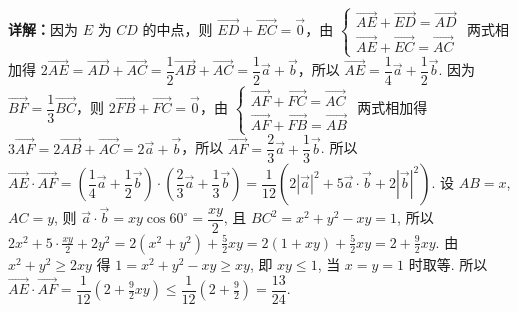 \begin{question}[points=5]
\begin{solution}
\textbf{详解：}因为 $E$ 为 $CD$ 的中点，则 $\overrightarrow{ED} + \overrightarrow{EC} = \vec{0}$，由 $\begin{cases} \overrightarrow{AE} + \overrightarrow{ED} = \overrightarrow{AD} \\ \overrightarrow{AE} + \overrightarrow{EC} = \overrightarrow{AC} \end{cases}$ 两式相加得 $2\overrightarrow{AE} = \overrightarrow{AD} + \overrightarrow{AC} = \dfrac{1}{2}\overrightarrow{AB} + \overrightarrow{AC} = \dfrac{1}{2}\vec{a} + \vec{b}$，所以 $\overrightarrow{AE} = \dfrac{1}{4}\vec{a} + \dfrac{1}{2}\vec{b}$. 因为 $\overrightarrow{BF} = \dfrac{1}{3}\overrightarrow{BC}$，则 $2\overrightarrow{FB} + \overrightarrow{FC} = \vec{0}$，由 $\begin{cases} \overrightarrow{AF} + \overrightarrow{FC} = \overrightarrow{AC} \\ \overrightarrow{AF} + \overrightarrow{FB} = \overrightarrow{AB} \end{cases}$ 两式相加得 $3\overrightarrow{AF} = 2\overrightarrow{AB} + \overrightarrow{AC} = 2\vec{a} + \vec{b}$，所以 $\overrightarrow{AF} = \dfrac{2}{3}\vec{a} + \dfrac{1}{3}\vec{b}$. 所以 $\overrightarrow{AE} \cdot \overrightarrow{AF} = \left(\dfrac{1}{4}\vec{a} + \dfrac{1}{2}\vec{b}\right) \cdot \left(\dfrac{2}{3}\vec{a} + \dfrac{1}{3}\vec{b}\right) = \dfrac{1}{12}(2|\vec{a}|^2 + 5\vec{a}\cdot\vec{b} + 2|\vec{b}|^2)$. 设 $AB = x$, $AC = y$, 则 $\vec{a}\cdot\vec{b} = xy\cos60^\circ = \dfrac{xy}{2}$, 且 $BC^2 = x^2 + y^2 - xy = 1$, 所以 $2x^2 + 5\cdot\frac{xy}{2} + 2y^2 = 2(x^2 + y^2) + \frac{5}{2}xy = 2(1+xy) + \frac{5}{2}xy = 2 + \frac{9}{2}xy$. 由 $x^2 + y^2 \ge 2xy$ 得 $1 = x^2 + y^2 - xy \ge xy$, 即 $xy \le 1$, 当 $x = y = 1$ 时取等. 所以 $\overrightarrow{AE} \cdot \overrightarrow{AF} = \dfrac{1}{12}\left(2 + \frac{9}{2}xy\right) \le \dfrac{1}{12}\left(2 + \frac{9}{2}\right) = \dfrac{13}{24}$.
\end{solution}
\end{question}

